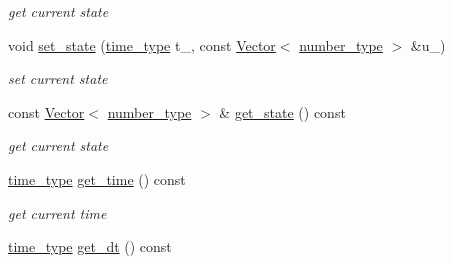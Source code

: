 \begin{DoxyCompactItemize}
\begin{DoxyCompactList}\small\item\em get current state \item\end{DoxyCompactList}\item 
\hypertarget{classhdnum_1_1IE_aa333a60e09305968c3ae333a06c5abd4}{
void \hyperlink{classhdnum_1_1IE_aa333a60e09305968c3ae333a06c5abd4}{set\_\-state} (\hyperlink{classhdnum_1_1IE_a4a58f86ec61809cbca7b16922dcbb39e}{time\_\-type} t\_\-, const \hyperlink{classhdnum_1_1Vector}{Vector}$<$ \hyperlink{classhdnum_1_1IE_a23de7a983f5419c37d8530d49cab4913}{number\_\-type} $>$ \&u\_\-)}
\label{classhdnum_1_1IE_aa333a60e09305968c3ae333a06c5abd4}

\begin{DoxyCompactList}\small\item\em set current state \item\end{DoxyCompactList}\item 
\hypertarget{classhdnum_1_1IE_a7c9b9284e27f01f67f776f7e6b5c4cf7}{
const \hyperlink{classhdnum_1_1Vector}{Vector}$<$ \hyperlink{classhdnum_1_1IE_a23de7a983f5419c37d8530d49cab4913}{number\_\-type} $>$ \& \hyperlink{classhdnum_1_1IE_a7c9b9284e27f01f67f776f7e6b5c4cf7}{get\_\-state} () const }
\label{classhdnum_1_1IE_a7c9b9284e27f01f67f776f7e6b5c4cf7}

\begin{DoxyCompactList}\small\item\em get current state \item\end{DoxyCompactList}\item 
\hypertarget{classhdnum_1_1IE_a2abb282e43dc676c2b192f49e732986a}{
\hyperlink{classhdnum_1_1IE_a4a58f86ec61809cbca7b16922dcbb39e}{time\_\-type} \hyperlink{classhdnum_1_1IE_a2abb282e43dc676c2b192f49e732986a}{get\_\-time} () const }
\label{classhdnum_1_1IE_a2abb282e43dc676c2b192f49e732986a}

\begin{DoxyCompactList}\small\item\em get current time \item\end{DoxyCompactList}\item 
\hypertarget{classhdnum_1_1IE_aeaea0a1cdee7135d0e85e980c4f15179}{
\hyperlink{classhdnum_1_1IE_a4a58f86ec61809cbca7b16922dcbb39e}{time\_\-type} \hyperlink{classhdnum_1_1IE_aeaea0a1cdee7135d0e85e980c4f15179}{get\_\-dt} () const }
\label{classhdnum_1_1IE_aeaea0a1cdee7135d0e85e980c4f15179}


\end{DoxyCompactItemize}
